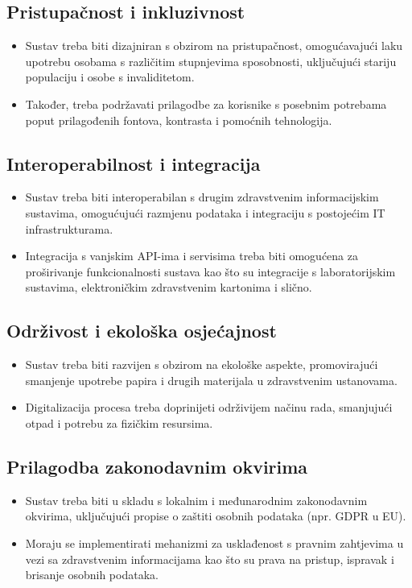 \documentclass[12pt]{report}
\begin{document}
\subsection*{Pristupačnost i inkluzivnost}
\begin{itemize}
\item Sustav treba biti dizajniran s obzirom na pristupačnost, omogućavajući laku upotrebu osobama s različitim stupnjevima sposobnosti, uključujući stariju populaciju i osobe s invaliditetom.
\item Također, treba podržavati prilagodbe za korisnike s posebnim potrebama poput prilagođenih fontova, kontrasta i pomoćnih tehnologija.
\end{itemize}

\subsection*{Interoperabilnost i integracija}
\begin{itemize}
    \item Sustav treba biti interoperabilan s drugim zdravstvenim informacijskim sustavima, omogućujući razmjenu podataka i integraciju s postojećim IT infrastrukturama.
    \item Integracija s vanjskim API-ima i servisima treba biti omogućena za proširivanje funkcionalnosti sustava kao što su integracije s laboratorijskim sustavima, elektroničkim zdravstvenim kartonima i slično.
\end{itemize}

\subsection*{Održivost i ekološka osjećajnost}
\begin{itemize}
    \item Sustav treba biti razvijen s obzirom na ekološke aspekte, promovirajući smanjenje upotrebe papira i drugih materijala u zdravstvenim ustanovama.
    \item Digitalizacija procesa treba doprinijeti održivijem načinu rada, smanjujući otpad i potrebu za fizičkim resursima.
\end{itemize}

\subsection*{Prilagodba zakonodavnim okvirima}
\begin{itemize}
    \item Sustav treba biti u skladu s lokalnim i međunarodnim zakonodavnim okvirima, uključujući propise o zaštiti osobnih podataka (npr. GDPR u EU).
    \item Moraju se implementirati mehanizmi za usklađenost s pravnim zahtjevima u vezi sa zdravstvenim informacijama kao što su prava na pristup, ispravak i brisanje osobnih podataka.
\end{itemize}
\end{document}
